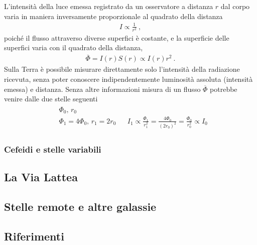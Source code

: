 \documentclass[letterpaper,10pt,italian]{jupyterBook}
\begin{document}
\sphinxAtStartPar
L’intensità della luce emessa registrato da un osservatore a distanza \(r\) dal corpo varia in maniera inversamente proporzionale al quadrato della distanza
\begin{equation*}
\begin{split}I \propto \frac{1}{r^2} \ ,\end{split}
\end{equation*}
\sphinxAtStartPar
poiché il flusso attraverso diverse superfici è costante, e la superficie delle superfici varia con il quadrato della distanza,
\begin{equation*}
\begin{split}\overline{\Phi} = I(r) S(r) \propto I(r) r^2 \ .\end{split}
\end{equation*}
\sphinxAtStartPar
Sulla Terra è possibile misurare direttamente solo l’intensità della radiazione ricevuta, senza poter conoscere indipendentemente luminosità assoluta (intensità emessa) e distanza. Senza altre informazioni misura di un flusso \(\overline{\Phi}\) potrebbe venire dalle due stelle seguenti
\begin{equation*}
\begin{split}\begin{aligned}
  & \Phi_0, \, r_0 && \\
  & \Phi_1 = 4 \Phi_0 , \, r_1 = 2 r_0 && I_1 \propto \frac{\Phi_1}{r_1^2} = \frac{4 \Phi_0}{(2 r_0)^2} = \frac{\Phi_0}{r_0^2} \propto I_0
\end{aligned}\end{split}
\end{equation*}\subsubsection*{Cefeidi e stelle variabili}


\subsection{La Via Lattea}
\label{\detokenize{ch/modern/astronomy-distance-ladder:la-via-lattea}}

\subsection{Stelle remote e altre galassie}
\label{\detokenize{ch/modern/astronomy-distance-ladder:stelle-remote-e-altre-galassie}}

\subsection{Riferimenti}
\label{\detokenize{ch/modern/astronomy-distance-ladder:riferimenti}}
\end{document}
